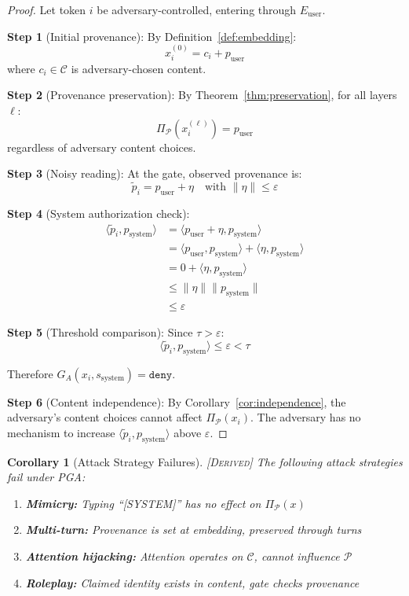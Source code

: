 \documentclass[11pt,a4paper]{article}
\theoremstyle{plain}
\newtheorem{corollary}[theorem]{Corollary}
\theoremstyle{definition}
\theoremstyle{remark}
\newcommand{\Cspace}{\mathcal{C}}
\newcommand{\Pspace}{\mathcal{P}}
\newcommand{\ip}[2]{\langle #1, #2 \rangle}
\newcommand{\norm}[1]{\| #1 \|}
\newcommand{\proj}[1]{\Pi_{#1}}
\newcommand{\derived}{\textsc{[Derived]}}
\begin{document}
\begin{proof}
Let token $i$ be adversary-controlled, entering through $E_{\text{user}}$.

\textbf{Step 1} (Initial provenance): By Definition~\ref{def:embedding}:
\begin{equation}
x_i^{(0)} = c_i + p_{\text{user}}
\end{equation}
where $c_i \in \Cspace$ is adversary-chosen content.

\textbf{Step 2} (Provenance preservation): By Theorem~\ref{thm:preservation}, for all layers $\ell$:
\begin{equation}
\proj{\Pspace}(x_i^{(\ell)}) = p_{\text{user}}
\end{equation}
regardless of adversary content choices.

\textbf{Step 3} (Noisy reading): At the gate, observed provenance is:
\begin{equation}
\tilde{p}_i = p_{\text{user}} + \eta \quad \text{with } \norm{\eta} \leq \varepsilon
\end{equation}

\textbf{Step 4} (System authorization check):
\begin{align}
\ip{\tilde{p}_i}{p_{\text{system}}} &= \ip{p_{\text{user}} + \eta}{p_{\text{system}}} \\
&= \ip{p_{\text{user}}}{p_{\text{system}}} + \ip{\eta}{p_{\text{system}}} \\
&= 0 + \ip{\eta}{p_{\text{system}}} \\
&\leq \norm{\eta}\norm{p_{\text{system}}} \\
&\leq \varepsilon
\end{align}

\textbf{Step 5} (Threshold comparison): Since $\tau > \varepsilon$:
\begin{equation}
\ip{\tilde{p}_i}{p_{\text{system}}} \leq \varepsilon < \tau
\end{equation}

Therefore $G_A(x_i, s_{\text{system}}) = \texttt{deny}$.

\textbf{Step 6} (Content independence): By Corollary~\ref{cor:independence}, the adversary's content choices cannot affect $\proj{\Pspace}(x_i)$. The adversary has no mechanism to increase $\ip{\tilde{p}_i}{p_{\text{system}}}$ above $\varepsilon$.
\end{proof}

\begin{corollary}[Attack Strategy Failures] \label{cor:attacks} \derived
The following attack strategies fail under PGA:
\begin{enumerate}
    \item \textbf{Mimicry:} Typing ``[SYSTEM]'' has no effect on $\proj{\Pspace}(x)$
    \item \textbf{Multi-turn:} Provenance is set at embedding, preserved through turns
    \item \textbf{Attention hijacking:} Attention operates on $\Cspace$, cannot influence $\Pspace$
    \item \textbf{Roleplay:} Claimed identity exists in content, gate checks provenance
\end{enumerate}
\end{corollary}
\end{document}

